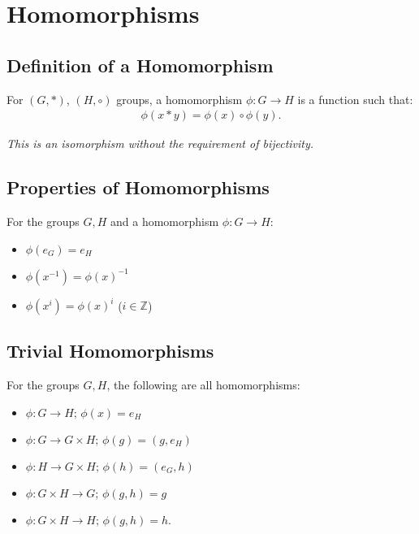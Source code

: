 \documentclass[a4paper, 12pt, twoside]{article}
\begin{document}
\newpage

\section{Homomorphisms}

\subsection{Definition of a Homomorphism}

For $(G, *)$, $(H, \circ)$ groups, a homomorphism $\phi : G \to H$
is a function such that:
\begin{align*}
      \phi(x * y) = \phi(x) \circ \phi(y). \tag{$\forall x, y \in G$}
\end{align*}

\textit{This is an isomorphism without the requirement of bijectivity.}

\subsection{Properties of Homomorphisms}

For the groups $G, H$ and a homomorphism $\phi : G \to H$:

\begin{itemize}
      \item $\phi(e_G) = e_H$
      \item $\phi(x^{-1}) = \phi(x)^{-1}$
      \item $\phi(x^i) = \phi(x)^i$ ($i \in \mathbb{Z}$)
\end{itemize}

\subsection{Trivial Homomorphisms}

For the groups $G, H$, the following are all homomorphisms:

\begin{itemize}
      \item $\phi: G \to H; \, \phi(x) = e_H$
      \item $\phi: G \to G \times H; \, \phi(g) = (g, e_H)$
      \item $\phi: H \to G \times H; \, \phi(h) = (e_G, h)$
      \item $\phi: G \times H \to G; \, \phi(g, h) = g$
      \item $\phi: G \times H \to H; \, \phi(g, h) = h$.
\end{itemize}
\end{document}
